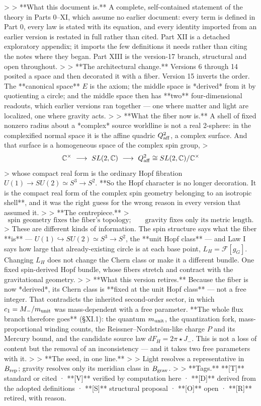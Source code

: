 >
> **What this document is.** A complete, self-contained statement of the theory in Parts 0–XI, which assume no earlier document: every term is defined in Part 0, every law is stated with its equation, and every identity imported from an earlier version is restated in full rather than cited. Part XII is a detached exploratory appendix; it imports the few definitions it needs rather than citing the notes where they began. Part XIII is the version-17 branch, structural and open throughout.
>
> **The architectural change.** Versions 6 through 14 posited a space and then decorated it with a fiber. Version 15 inverts the order. The **canonical space** $E$ is the axiom; the middle space is *derived* from it by quotienting a circle; and the middle space then has **two** four-dimensional readouts, which earlier versions ran together — one where matter and light are localized, one where gravity acts.
>
> **What the fiber now is.** A shell of fixed nonzero radius about a *complex* source worldline is not a real 2-sphere: in the complexified normal space it is the affine quadric $Q^2_{\rm aff}$, a complex surface. And that surface is a homogeneous space of the complex spin group,
> $$\mathbb{C}^\times\ \longrightarrow\ SL(2,\mathbb{C})\ \longrightarrow\ Q^2_{\rm aff}\cong SL(2,\mathbb{C})/\mathbb{C}^\times$$
> whose compact real form is the ordinary Hopf fibration $U(1)\to SU(2)\simeq S^3\to S^2$. **So the Hopf character is no longer decoration. It is the compact real form of the complex spin geometry belonging to an isotropic shell**, and it was the right guess for the wrong reason in every version that assumed it.
>
> **The centrepiece.**
> $$\boxed{\ \text{spin geometry fixes the fiber's topology;}\qquad\text{gravity fixes only its metric length.}\ }$$
> These are different kinds of information. The spin structure says what the fiber **is** — $U(1)\hookrightarrow SU(2)\simeq S^3\to S^2$, the **unit Hopf class** — and Law I says how large that already-existing circle is at each base point, $L_H = \mathcal{F}[g_G]$. Changing $L_H$ does not change the Chern class or make it a different bundle. One fixed spin-derived Hopf bundle, whose fibers stretch and contract with the gravitational geometry.
>
> **What this version retires.** Because the fiber is now *derived*, its Chern class is **fixed at the unit Hopf class** — not a free integer. That contradicts the inherited second-order sector, in which $c_1 = M_-/m_{\rm unit}$ was mass-dependent with a free parameter. **The whole flux branch therefore goes** (§XI.1): the quantum $m_{\rm unit}$, the quantization fork, mass-proportional winding counts, the Reissner–Nordström-like charge $P$ and its Mercury bound, and the candidate source law $dF_H = 2\pi\star J_-$. This is not a loss of content but the removal of an inconsistency — and it takes two free parameters with it.
>
> **The seed, in one line.**
> > Light resolves a representative in $B_{\rm rep}$; gravity resolves only its meridian class in $B_{\rm grav}$.
>
> **Tags.** **[T]** standard or cited · **[V]** verified by computation here · **[D]** derived from the adopted definitions · **[S]** structural proposal · **[O]** open · **[R]** retired, with reason.

